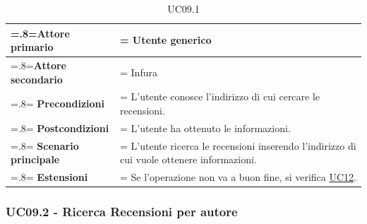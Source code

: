             \begin{table}[H]
                \centering
                \renewcommand{\arraystretch}{1.8}
                \renewcommand\tabularxcolumn[1]{m{#1}}
                \begin{tabularx}{0.9\textwidth} {
                    >{\hsize=.8\hsize\linewidth=\hsize}X
                    >{\hsize=1.2\hsize\linewidth=\hsize}X}
                    \hline
                    \textbf{Attore primario} & Utente generico \\
                    \hline
                    \textbf{Attore secondario} & Infura \\
                    \hline
                    \textbf{Precondizioni} & L'utente conosce l'indirizzo di cui cercare le recensioni. \\
                    \hline
                    \textbf{Postcondizioni} & L'utente ha ottenuto le informazioni. \\
                    \hline
                    \textbf{Scenario principale} & L'utente ricerca le recensioni inserendo l'indirizzo di cui vuole ottenere informazioni.\\
                    \hline
                    \textbf{Estensioni} & Se l'operazione non va a buon fine, si verifica \hyperref[UC12]{UC12}. \\
                    \hline
                \end{tabularx}
                \caption{UC09.1}
            \end{table}

        \subsubsection{UC09.2 - Ricerca Recensioni per autore}
        \label{UC09.2}

